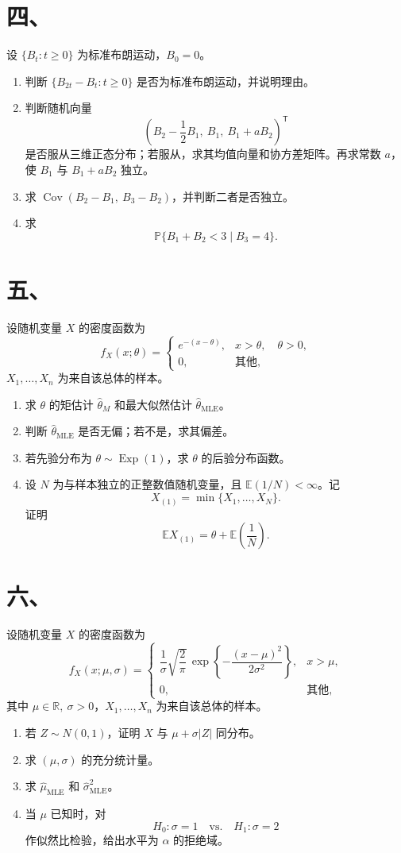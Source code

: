 \documentclass[UTF8,zihao=-4,fontset=windows]{ctexart}
\newcommand{\Prob}{\mathbb P}
\newcommand{\EX}{\mathbb E}
\newcommand{\Cov}{\operatorname{Cov}}
\begin{document}
\section*{四、}
设 $\{B_t:t\ge 0\}$ 为标准布朗运动，$B_0=0$。
\begin{enumerate}
  \item 判断 $\{B_{2t}-B_t:t\ge 0\}$ 是否为标准布朗运动，并说明理由。
  \item 判断随机向量
  \[
    \left(B_2-\frac12B_1,\ B_1,\ B_1+aB_2\right)^{\mathsf T}
  \]
  是否服从三维正态分布；若服从，求其均值向量和协方差矩阵。再求常数 $a$，使 $B_1$ 与 $B_1+aB_2$ 独立。
  \item 求 $\Cov(B_2-B_1,\ B_3-B_2)$，并判断二者是否独立。
  \item 求
  \[
    \Prob\{B_1+B_2<3\mid B_3=4\}.
  \]
\end{enumerate}

\section*{五、}
设随机变量 $X$ 的密度函数为
\[
  f_X(x;\theta)=
  \begin{cases}
    e^{-(x-\theta)}, & x>\theta,\quad \theta>0,\\
    0, & \text{其他},
  \end{cases}
\]
$X_1,\ldots,X_n$ 为来自该总体的样本。
\begin{enumerate}
  \item 求 $\theta$ 的矩估计 $\hat\theta_M$ 和最大似然估计 $\hat\theta_{\mathrm{MLE}}$。
  \item 判断 $\hat\theta_{\mathrm{MLE}}$ 是否无偏；若不是，求其偏差。
  \item 若先验分布为 $\theta\sim \operatorname{Exp}(1)$，求 $\theta$ 的后验分布函数。
  \item 设 $N$ 为与样本独立的正整数值随机变量，且 $\EX(1/N)<\infty$。记
  \[
    X_{(1)}=\min\{X_1,\ldots,X_N\}.
  \]
  证明
  \[
    \EX X_{(1)}=\theta+\EX\left(\frac1N\right).
  \]
\end{enumerate}

\section*{六、}
设随机变量 $X$ 的密度函数为
\[
  f_X(x;\mu,\sigma)=
  \begin{cases}
    \dfrac{1}{\sigma}\sqrt{\dfrac2\pi}\,
    \exp\left\{-\dfrac{(x-\mu)^2}{2\sigma^2}\right\},
    & x>\mu,\\
    0, & \text{其他},
  \end{cases}
\]
其中 $\mu\in\mathbb R,\ \sigma>0$，$X_1,\ldots,X_n$ 为来自该总体的样本。
\begin{enumerate}
  \item 若 $Z\sim N(0,1)$，证明 $X$ 与 $\mu+\sigma |Z|$ 同分布。
  \item 求 $(\mu,\sigma)$ 的充分统计量。
  \item 求 $\hat\mu_{\mathrm{MLE}}$ 和 $\hat\sigma^2_{\mathrm{MLE}}$。
  \item 当 $\mu$ 已知时，对
  \[
    H_0:\sigma=1\quad \text{vs.}\quad H_1:\sigma=2
  \]
  作似然比检验，给出水平为 $\alpha$ 的拒绝域。
\end{enumerate}
\end{document}
